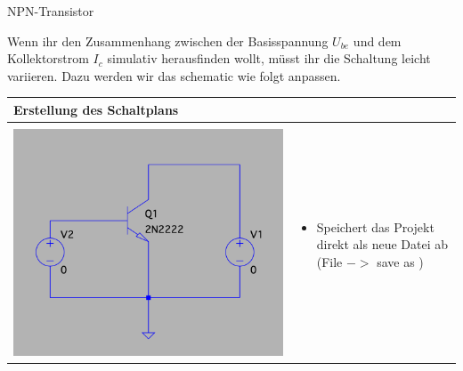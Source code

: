      \begin{frame}[t]{NPN-Transistor}
      
      \begin{spacing}{0.6} \begin{tiny}
      
      Wenn ihr den Zusammenhang zwischen der Basisspannung $U_{be}$ und dem Kollektorstrom $I_c$ simulativ herausfinden wollt, müsst
      ihr die Schaltung leicht variieren. Dazu werden wir das schematic wie folgt anpassen. 

      \end{tiny} \end{spacing}
      \begin{spacing}{0.9} \begin{tiny}
      \begin{table}[h!]
        \begin{tabular}{p{3cm} p{7cm}}
          \hline
          \textbf{Erstellung des Schaltplans} & \\
          \hline \\
          \begin{minipage}{.3\textwidth}
            \includegraphics[width=\linewidth]{pictures/tran2.png}
          \end{minipage} 
          & 
          \begin{minipage}{.7\textwidth}
          \begin{itemize}
            \item Speichert das Projekt direkt als neue Datei ab (File $->$ save as ) 

\end{itemize}
\end{minipage}
\end{tabular}
\end{table}
\end{tiny}
\end{spacing}
\end{frame}
